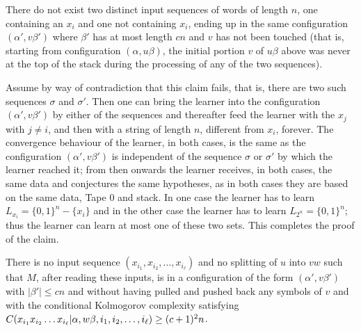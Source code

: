 \documentclass{LMCS}
\theoremstyle{plain}\newtheorem{athm}[thm]{Theorem}
\theoremstyle{plain}\newtheorem{aprop}[thm]{Proposition}
\theoremstyle{plain}\newtheorem{aprob}[thm]{Open Problem}
\theoremstyle{plain}\newtheorem{acor}[thm]{Corollary}
\theoremstyle{plain}\newtheorem{alem}[thm]{Lemma}
\theoremstyle{definition}\newtheorem{adefn}[thm]{Definition}
\theoremstyle{definition}\newtheorem{arem}[thm]{Remark}
\theoremstyle{plain}\newtheorem{aexmp}[thm]{Example}
\theoremstyle{plain}\newtheorem{aclm}[thm]{Claim}
\begin{document}
\begin{clm} \label{cl:first}
There do not exist two distinct input sequences of words of length
$n$, one containing an $x_i$ 
and one not containing $x_i$, ending up in the same configuration
$(\alpha',v\beta')$ where $\beta'$ has at most length $cn$ and $v$ has not been
touched (that is, starting from configuration $(\alpha,u\beta)$, the
initial portion 
$v$ of $u\beta$ above 
was never at the top of the stack during the processing of any of the
two sequences).
\end{clm}

\noindent
Assume by way of contradiction that this claim fails, that is, 
there are two such sequences $\sigma$ and $\sigma'$. Then one can
bring the learner into the
configuration $(\alpha',v\beta')$ by either of the sequences and thereafter feed
the learner with the $x_j$ with $j \neq i$, and then with a string 
of length $n$, different from $x_i$, forever.
The convergence
behaviour of the learner, in both cases, is the same as the configuration
$(\alpha',v\beta')$ is independent of the sequence $\sigma$ or $\sigma'$
by which the learner reached it;
from then onwards the learner receives, in both cases, the same data and 
conjectures the same hypotheses, as in both cases they are based on 
the same data, Tape 0 and stack.
In one case the learner has to learn $L_{x_i} = \{0,1\}^n-\{x_i\}$ and in
the other case the learner has to learn $L_{2^n} = \{0,1\}^n$; thus
the learner can learn at most one of these two sets.
This completes the proof of the claim.

\begin{clm} \label{cl:second}
There is no input sequence $(x_{i_1},x_{i_2},\ldots,x_{i_\ell})$
and no splitting of $u$ into $vw$ such that $M$, after reading these
inputs, is in a configuration of the form $(\alpha',v\beta')$ with
$|\beta'| \leq cn$ and without having pulled and pushed back any
symbols of $v$ and with the conditional Kolmogorov complexity satisfying
$C(x_{i_1} \linebreak[3] x_{i_2} \linebreak[3] \ldots \linebreak[3]
x_{i_\ell}| \alpha ,w\beta, \linebreak[3] i_1,i_2,\ldots,i_\ell) 
\linebreak[3] \geq
(c+1)^2n$.
\end{clm}
\end{document}
